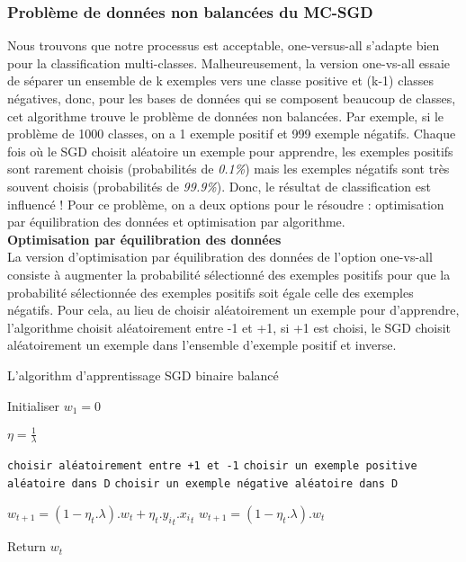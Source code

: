 \subsubsection{Problème de données non balancées du MC-SGD}
Nous trouvons que notre processus est acceptable, one-versus-all s'adapte bien pour la classification multi-classes. Malheureusement, la version one-vs-all essaie de séparer un ensemble de k exemples vers une classe positive et (k-1) classes négatives, donc, pour les bases de données qui se composent beaucoup de classes, cet algorithme trouve le problème de données non balancées. Par exemple, si le problème de 1000 classes, on a 1 exemple positif et 999 exemple négatifs. Chaque fois où le SGD choisit aléatoire un exemple pour apprendre, les exemples positifs sont rarement choisis (probabilités de \emph{0.1\%}) mais les exemples négatifs sont très souvent choisis (probabilités de \emph{99.9\%}). Donc, le résultat de classification est influencé ! Pour ce problème, on a deux options pour le résoudre : optimisation par équilibration des données et optimisation par algorithme.\\

\textbf{Optimisation par équilibration des données}\\

La version d'optimisation par équilibration des données de l'option one-vs-all consiste à augmenter la probabilité sélectionné des exemples positifs pour que la probabilité sélectionnée des exemples positifs soit égale celle des exemples négatifs. Pour cela, au lieu de choisir aléatoirement un exemple pour d'apprendre, l'algorithme choisit aléatoirement entre -1 et +1, si +1 est choisi, le SGD choisit aléatoirement un exemple dans l'ensemble d'exemple positif et inverse.

\begin{algorithm}[H]
\caption{L'algorithm d'apprentissage SGD binaire balancé}\label{balance-sgdal}
\begin{algorithmic}[1]

\State Initialiser $w_1 = 0$


\State $\eta = \frac{1}{\lambda}$

\State \texttt{choisir aléatoirement entre +1 et -1}
\State \texttt{choisir un exemple positive aléatoire dans D}
\Else
\State \texttt{choisir un exemple négative aléatoire dans D}
\EndIf

\State $w_{t+1} = (1 - \eta_t.\lambda).w_t + \eta_t.{y_i}_t.{x_i}_t$
\Else
\State $w_{t+1} = (1 - \eta_t.\lambda).w_t$
\EndIf
\EndFor

\EndFor

\State Return $w_{t}$

\EndProcedure
\end{algorithmic}
\end{algorithm}

